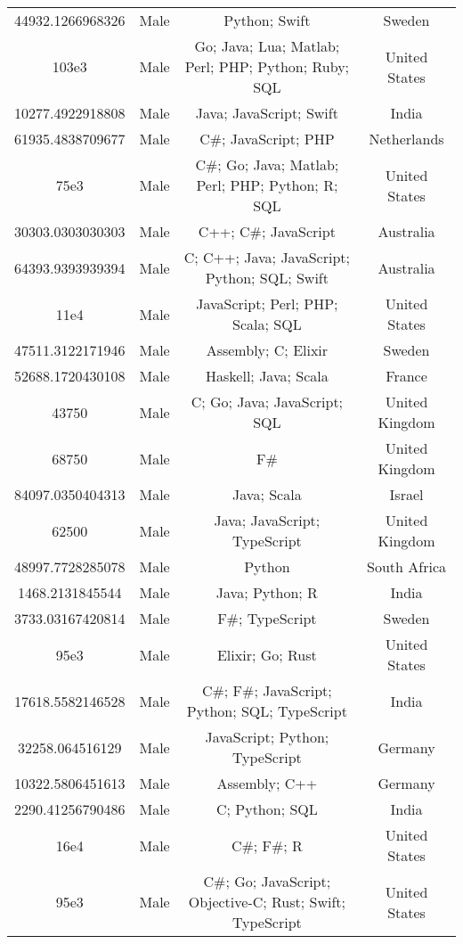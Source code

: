 \begin{center}
\begin{tabular}{ |c|c|c|c| }
44932.1266968326  &  Male  &  Python; Swift  &  Sweden  \\ 
103e3  &  Male  &  Go; Java; Lua; Matlab; Perl; PHP; Python; Ruby; SQL  &  United States  \\ 
10277.4922918808  &  Male  &  Java; JavaScript; Swift  &  India  \\ 
61935.4838709677  &  Male  &  C\#; JavaScript; PHP  &  Netherlands  \\ 
75e3  &  Male  &  C\#; Go; Java; Matlab; Perl; PHP; Python; R; SQL  &  United States  \\ 
30303.0303030303  &  Male  &  C++; C\#; JavaScript  &  Australia  \\ 
64393.9393939394  &  Male  &  C; C++; Java; JavaScript; Python; SQL; Swift  &  Australia  \\ 
11e4  &  Male  &  JavaScript; Perl; PHP; Scala; SQL  &  United States  \\ 
47511.3122171946  &  Male  &  Assembly; C; Elixir  &  Sweden  \\ 
52688.1720430108  &  Male  &  Haskell; Java; Scala  &  France  \\ 
43750  &  Male  &  C; Go; Java; JavaScript; SQL  &  United Kingdom  \\ 
68750  &  Male  &  F\#  &  United Kingdom  \\ 
84097.0350404313  &  Male  &  Java; Scala  &  Israel  \\ 
62500  &  Male  &  Java; JavaScript; TypeScript  &  United Kingdom  \\ 
48997.7728285078  &  Male  &  Python  &  South Africa  \\ 
1468.2131845544  &  Male  &  Java; Python; R  &  India  \\ 
3733.03167420814  &  Male  &  F\#; TypeScript  &  Sweden  \\ 
95e3  &  Male  &  Elixir; Go; Rust  &  United States  \\ 
17618.5582146528  &  Male  &  C\#; F\#; JavaScript; Python; SQL; TypeScript  &  India  \\ 
32258.064516129  &  Male  &  JavaScript; Python; TypeScript  &  Germany  \\ 
10322.5806451613  &  Male  &  Assembly; C++  &  Germany  \\ 
2290.41256790486  &  Male  &  C; Python; SQL  &  India  \\ 
16e4  &  Male  &  C\#; F\#; R  &  United States  \\ 
95e3  &  Male  &  C\#; Go; JavaScript; Objective-C; Rust; Swift; TypeScript  &  United States  \\ 

\end{tabular}
\end{center}
